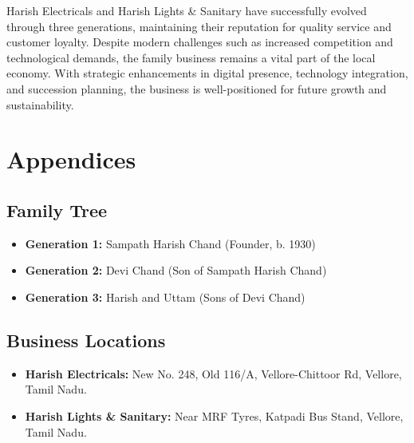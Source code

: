 \documentclass[a4paper,12pt]{report}
\begin{document}
Harish Electricals and Harish Lights \& Sanitary have successfully evolved through three generations, maintaining their reputation for quality service and customer loyalty. Despite modern challenges such as increased competition and technological demands, the family business remains a vital part of the local economy. With strategic enhancements in digital presence, technology integration, and succession planning, the business is well-positioned for future growth and sustainability.

\chapter{Appendices}

\section{Family Tree}
\begin{itemize}
    \item \textbf{Generation 1:} Sampath Harish Chand (Founder, b. 1930)
    \item \textbf{Generation 2:} Devi Chand (Son of Sampath Harish Chand)
    \item \textbf{Generation 3:} Harish and Uttam (Sons of Devi Chand)
\end{itemize}

\section{Business Locations}
\begin{itemize}
    \item \textbf{Harish Electricals:} New No. 248, Old 116/A, Vellore-Chittoor Rd, Vellore, Tamil Nadu.
    \item \textbf{Harish Lights \& Sanitary:} Near MRF Tyres, Katpadi Bus Stand, Vellore, Tamil Nadu.
\end{itemize}
\end{document}
